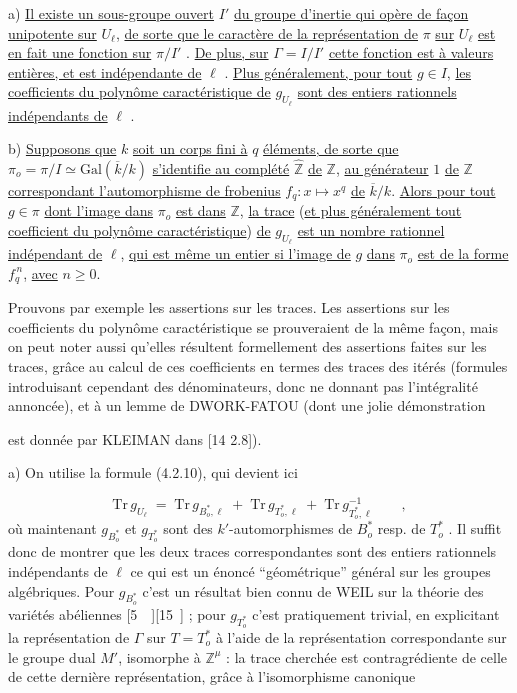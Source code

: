 a) \underline{Il existe un sous-groupe ouvert} $I'$ \underline{du groupe d'inertie qui opère de façon unipotente sur} $U_\ell$, \underline{de sorte que le caractère de la représentation de} $\pi$ \underline{sur} $U_\ell$ \underline{est en fait une fonction sur} $\pi/I'$ . \underline{De plus, sur} $\Gamma = I/I'$ \underline{cette fonction est à valeurs entières, et est indépendante de} $\ell$ . \underline{Plus généralement, pour tout} $g \in I$, \underline{les coefficients du polynôme caractéristique de} $g_{U_\ell}$ \underline{sont des entiers rationnels indépendants de} $\ell$ .

b) \underline{Supposons que} $k$ \underline{soit un corps fini à} $q$ \underline{éléments, de sorte que} $\pi_o = \pi/I \simeq \mathrm{Gal}(\overline{k}/k)$ \underline{s'identifie au complété} $\widehat{\mathbb{Z}}$ \underline{de} $\mathbb{Z}$, \underline{au générateur} $1$ \underline{de} $\mathbb{Z}$ \underline{correspondant l'automorphisme de frobenius} $f_q : x \longmapsto x^q$ \underline{de} $\overline{k}/k$. \underline{Alors pour tout} $g \in \pi$ \underline{dont l'image dans} $\pi_o$ \underline{est dans} $\mathbb{Z}$, \underline{la trace} (\underline{et plus généralement tout coefficient du polynôme caractéristique}) \underline{de} $g_{U_\ell}$ \underline{est un nombre rationnel indépendant de} $\ell$, \underline{qui est même un entier si l'image de} $g$ \underline{dans} $\pi_o$ \underline{est de la forme} $f_q^{\,n}$, \underline{avec} $n \geq 0$.

Prouvons par exemple les assertions sur les traces. Les assertions sur les coefficients du polynôme caractéristique se prouveraient de la même façon, mais on peut noter aussi qu'elles résultent formellement des assertions faites sur les traces, grâce au calcul de ces coefficients en termes des traces des itérés (formules introduisant cependant des dénominateurs, donc ne donnant pas l'intégralité annoncée), et à un lemme de DWORK-FATOU (dont une jolie démonstration



est donnée par KLEIMAN dans [14 2.8]).

a) On utilise la formule (4.2.10), qui devient ici

\begin{equation}\tag{4.3.0}
\mathrm{Tr}\, g_{U_\ell} \;=\; \mathrm{Tr}\, g_{B^{*}_{o},\ell} \;+\; \mathrm{Tr}\, g_{T^{*}_{o},\ell} \;+\; \mathrm{Tr}\, g^{-1}_{T^{*}_{o},\ell} \qquad ,
\end{equation}
où maintenant $g_{B^{*}_{o}}$ et $g_{T^{*}_{o}}$ sont des $k'$-automorphismes de $B^{*}_{o}$ resp. de $T^{*}_{o}$ . Il suffit donc de montrer que les deux traces correspondantes sont des entiers rationnels indépendants de $\ell$ ce qui est un énoncé ``géométrique'' général sur les groupes algébriques. Pour $g_{B^{*}_{o}}$ c'est un résultat bien connu de WEIL sur la théorie des variétés abéliennes [5\ \ ][15\ ] ; pour $g_{T^{*}_{o}}$ c'est pratiquement trivial, en explicitant la représentation de $\Gamma$ sur $T = T^{*}_{o}$ à l'aide de la représentation correspondante sur le groupe dual $M'$, isomorphe à $\mathbb{Z}^{\mu}$ : la trace cherchée est contragrédiente de celle de cette dernière représentation, grâce à l'isomorphisme canonique

